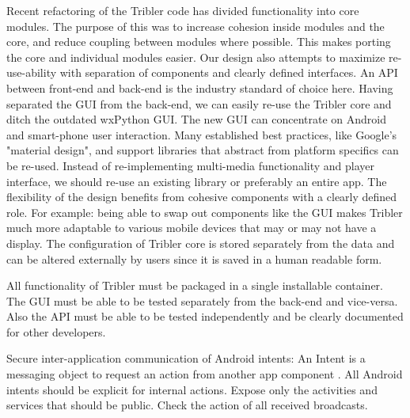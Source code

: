 Recent refactoring of the Tribler code has divided functionality into core modules.
The purpose of this was to increase cohesion inside modules and the core, and reduce coupling between modules where possible.
This makes porting the core and individual modules easier.
Our design also attempts to maximize re-use-ability with separation of components and clearly defined interfaces.
An API between front-end and back-end is the industry standard of choice here.
Having separated the GUI from the back-end, we can easily re-use the Tribler core and ditch the outdated wxPython GUI.
The new GUI can concentrate on Android and smart-phone user interaction.
Many established best practices, like Google's "material design", and support libraries that abstract from platform specifics can be re-used.
Instead of re-implementing multi-media functionality and player interface, we should re-use an existing library or preferably an entire app.
The flexibility of the design benefits from cohesive components with a clearly defined role.
For example: being able to swap out components like the GUI makes Tribler much more adaptable to various mobile devices that may or may not have a display.
The configuration of Tribler core is stored separately from the data and can be altered externally by users since it is saved in a human readable form.

All functionality of Tribler must be packaged in a single installable container.
The GUI must be able to be tested separately from the back-end and vice-versa.
Also the API must be able to be tested independently and be clearly documented for other developers.

Secure inter-application communication of Android intents:
An Intent is a messaging object to request an action from another app component \cite{android-intents}.
All Android intents should be explicit for internal actions. \cite{paper Analysing inter-application communication in Android}
Expose only the activities and services that should be public.
Check the action of all received broadcasts.

